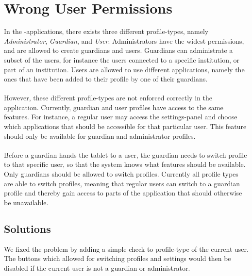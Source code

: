 \section{Wrong User Permissions}
\label{sec:wrong_user_permissions}

In the \giraf-applications, there exists three different profile-types, namely \emph{Administrator}, \emph{Guardian}, and \emph{User}. Administrators have the widest permissions, and are allowed to create guardians and users. Guardians can administrate a subset of the users, for instance the users connected to a specific institution, or part of an institution. Users are allowed to use different applications, namely the ones that have been added to their profile by one of their guardians. 
\\\\
However, these different profile-types are not enforced correctly in the \launcher application. Currently, guardian and user profiles have access to the same features. For instance, a regular user may access the settings-panel and choose which applications that should be accessible for that particular user. This feature should only be available for guardian and administrator profiles.
\\\\
Before a guardian hands the tablet to a user, the guardian needs to switch profile to that specific user, so that the system knows what features should be available. Only guardians should be allowed to switch profiles. Currently all profile types are able to switch profiles, meaning that regular users can switch to a guardian profile and thereby gain access to parts of the application that should otherwise be unavailable.

\subsection{Solutions}
\label{sub:wrong_user_permissions_solutions}

We fixed the problem by adding a simple check to profile-type of the current user. The buttons which allowed for switching profiles and settings would then be disabled if the current user is not a guardian or administrator.